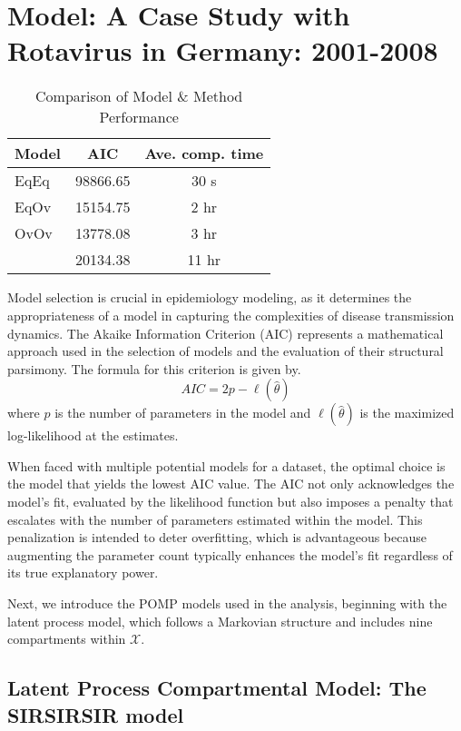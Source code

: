 \documentclass[10pt]{article}
\begin{document}
\section{Model: A Case Study with Rotavirus in Germany: 2001-2008}


\begin{table}[ht]
\centering
\caption{Comparison of Model \& Method Performance \citep{wwr}}
\label{tab:model_performance}
\renewcommand{\arraystretch}{1.5}
\begin{tabular}{@{}lcc@{}}
\toprule
\textbf{Model} & \textbf{AIC} & \textbf{Ave. comp. time} \\
\midrule
EqEq & 98866.65 & 30 s \\
EqOv & 15154.75 & 2 hr \\
OvOv & 13778.08 & 3 hr \\
\cite{stocks} & 20134.38 & 11 hr \\
\bottomrule
\end{tabular}
\end{table}


Model selection is crucial in epidemiology modeling, as it determines the appropriateness of a model in capturing the complexities of disease transmission dynamics. The Akaike Information Criterion (AIC) represents a mathematical approach used in the selection of models and the evaluation of their structural parsimony. The formula for this criterion is given by.
$$
AIC = 2p - \ell(\hat{\theta})
$$
where $p$ is the number of parameters in the model and $\ell(\hat{\theta})$ is the maximized log-likelihood at the estimates. 

When faced with multiple potential models for a dataset, the optimal choice is the model that yields the lowest AIC value. The AIC not only acknowledges the model's fit, evaluated by the likelihood function but also imposes a penalty that escalates with the number of parameters estimated within the model. This penalization is intended to deter overfitting, which is advantageous because augmenting the parameter count typically enhances the model's fit regardless of its true explanatory power.

Next, we introduce the POMP models used in the analysis, beginning with the latent process model, which follows a Markovian structure and includes nine compartments within $\mathcal{X}$.


\subsection{Latent Process Compartmental Model: The SIRSIRSIR model}
\end{document}
